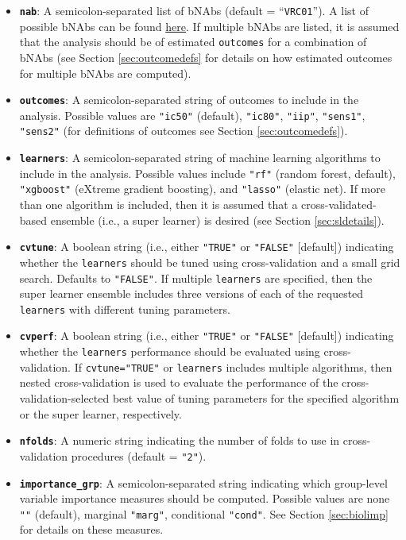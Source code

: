 \documentclass[]{article}
\providecommand{\tightlist}{%
  \setlength{\itemsep}{0pt}\setlength{\parskip}{0pt}}
\begin{document}
\begin{itemize}
\tightlist
\item
  \textbf{\texttt{nab}}: A semicolon-separated list of bNAbs (default = ``\texttt{VRC01}''). A list of possible bNAbs can be found \href{https://www.hiv.lanl.gov/components/sequence/HIV/neutralization/main.comp}{here}. If multiple bNAbs are listed, it is assumed that the analysis should be of estimated \texttt{outcomes} for a combination of bNAbs (see Section \ref{sec:outcomedefs} for details on how estimated outcomes for multiple bNAbs are computed).
\item
  \textbf{\texttt{outcomes}}: A semicolon-separated string of outcomes to include in the analysis. Possible values are \texttt{"ic50"} (default), \texttt{"ic80"}, \texttt{"iip"}, \texttt{"sens1"}, \texttt{"sens2"} (for definitions of outcomes see Section \ref{sec:outcomedefs}).
\item
  \textbf{\texttt{learners}}: A semicolon-separated string of machine learning algorithms to include in the analysis. Possible values include \texttt{"rf"} (random forest, default), \texttt{"xgboost"} (eXtreme gradient boosting), and \texttt{"lasso"} (elastic net). If more than one algorithm is included, then it is assumed that a cross-validated-based ensemble (i.e., a super learner) is desired (see Section \ref{sec:sldetails}).
\item
  \textbf{\texttt{cvtune}}: A boolean string (i.e., either \texttt{"TRUE"} or \texttt{"FALSE"} {[}default{]}) indicating whether the \texttt{learners} should be tuned using cross-validation and a small grid search. Defaults to \texttt{"FALSE"}. If multiple \texttt{learners} are specified, then the super learner ensemble includes three versions of each of the requested \texttt{learners} with different tuning parameters.
\item
  \textbf{\texttt{cvperf}}: A boolean string (i.e., either \texttt{"TRUE"} or \texttt{"FALSE"} {[}default{]}) indicating whether the \texttt{learners} performance should be evaluated using cross-validation. If \texttt{cvtune="TRUE"} or \texttt{learners} includes multiple algorithms, then nested cross-validation is used to evaluate the performance of the cross-validation-selected best value of tuning parameters for the specified algorithm or the super learner, respectively.
\item
  \textbf{\texttt{nfolds}}: A numeric string indicating the number of folds to use in cross-validation procedures (default = \texttt{"2"}).
\item
  \textbf{\texttt{importance\_grp}}: A semicolon-separated string indicating which group-level variable importance measures should be computed. Possible values are none \texttt{""} (default), marginal \texttt{"marg"}, conditional \texttt{"cond"}. See Section \ref{sec:biolimp} for details on these measures.

\end{itemize}
\end{document}
